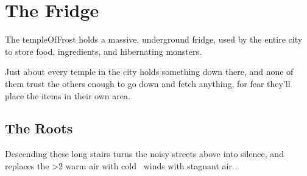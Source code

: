 \section{The Fridge}

\begin{multicols}{2}

\noindent
The \gls{templeOfFrost} holds a massive, underground fridge, used by the entire city to store food, \glspl{ingredient}, and hibernating \glspl{monster}.

Just about every \gls{temple} in the city holds something down there, and none of them trust the others enough to go down and fetch anything, for fear they'll place the items in their own area.

\renewcommand\csComments{
  \callout{12,21}{0,0}{\ref{fStairs}:~\nameref{fStairs}}{}
  \callout[12]{12,18}{0,0.5}{\ref{fHallStore}:~\nameref{fHallStore}}{}
  \callout[10]{10,15}{0,0}{\ref{fLift}:~\nameref{fLift}}{}
  \callout[10]{17,20}{-1,0}{\ref{fWheat}:~\nameref{fWheat}}{chalk lines the ground}
  \callout[10]{17,18}{-1,0}{\ref{fIngStore}:~\nameref{fIngStore}}{}
  \callout[10]{1,22}{2,-1}{\ref{fOffice}:~\nameref{fOffice}}{Everything entered must be registered}
  \callout[14]{2,17}{2,0}{\ref{fDip}:~\nameref{fDip}}{with oil barrels}
  \callout[10]{1,14}{2,-1}{\ref{fSide}:~\nameref{fSide}}{}
  \callout{12,16}{1,0}{Secrets}{}
  \callout{6,11}{4,0}{\ref{fBoat}:~\nameref{fBoat}}{there's a boat}
  \callout{8,0}{0,2.5}{\ref{fCrossbow}:~\nameref{fCrossbow}}{}
  \callout[10]{5,1}{0,0}{\ref{fHibernation}:~\nameref{fHibernation}}{}
  \callout[10]{11,1}{0,0}{\ref{fWeaponStore}:~\nameref{fWeaponStore}}{}
  \callout{17,7}{-1.8,-2.3}{\ref{fFabrics}:~\nameref{fFabrics}}{}
  \callout[10]{17,4}{-1,-2}{\ref{fGrain}:~\nameref{fGrain}}{}
  \callout[10]{16,1}{0,0}{\ref{fSpirits}:~\nameref{fSpirits}}{}
  \mapFeature{15,2}{\Huge \glssymbol{abderian}}
  \mapFeature{16,9}{\Huge \glssymbol{wrecan}}
  \mapFeature{3,6}{\Huge \glssymbol{sylf}}
  \mapFeature{2,1}{\Huge \glssymbol{sable}}
  \mapFeature{13,6}{\Huge \glssymbol{sable}}
  \mapFeature{12,3.6}{\Huge \glssymbol{paik}}
  \mapFeature{8,12}{\Huge \glssymbol{yonder}}
}


\subsection{The Roots}


Descending these long stairs turns the noisy streets above into silence, and replaces the
\ifnum\value{temperature}>2%
  warm air with cold%
\else%
  \showTemperature\ winds with stagnant air%
\fi.


\end{multicols}
